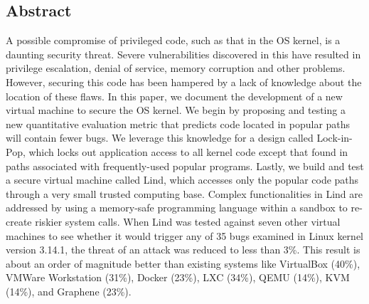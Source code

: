 \subsection*{Abstract}
A possible compromise of privileged code, such as that in the OS kernel, is a
daunting security threat. Severe vulnerabilities discovered in this
have resulted in privilege escalation, denial of service, memory corruption and
 other problems. However, securing this code has been hampered
  by a lack of knowledge about the location of these flaws. In this paper, we
 document the development of a new virtual
 machine to secure the OS kernel. We begin by proposing and testing a new
 quantitative evaluation metric that predicts code located
  in popular paths will contain fewer bugs. We leverage this knowledge
  for a design called  Lock-in-Pop, which locks out application access
 to all kernel code except that found in paths associated with frequently-used
 popular programs. Lastly, we build and test a secure virtual machine called Lind,
  which accesses only the popular code paths through a very small trusted computing
   base. Complex functionalities in Lind are addressed by using a memory-safe
    programming language within a sandbox to re-create riskier system calls.
  When Lind was tested against seven other virtual machines to see whether it would
   trigger any of 35 bugs examined in Linux kernel version 3.14.1, the threat of
    an attack was reduced to less than 3\%. This result is about an order of
    magnitude better than existing systems like VirtualBox (40\%), VMWare Workstation
     (31\%), Docker (23\%), LXC (34\%), QEMU (14\%), KVM (14\%), and Graphene (23\%).
